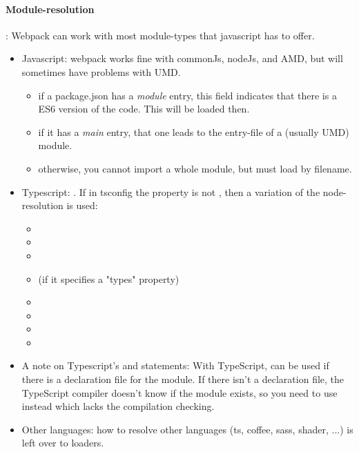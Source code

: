 \paragraph{Module-resolution}: Webpack can work with most module-types that javascript has to offer.

\begin{itemize}
    \item Javascript: webpack works fine with commonJs, nodeJs, and AMD, but will sometimes have problems with UMD.
        \begin{itemize}
            \item if a package.json has a \emph{module} entry, this field indicates that there is a ES6 version of the code. This will be loaded then.
            \item if it has a \emph{main} entry, that one leads to the entry-file of a (usually UMD) module.
            \item otherwise, you cannot import a whole module, but must load by filename.
        \end{itemize}
    \item Typescript: . If in tsconfig the property  is not , then a variation of the node-resolution is used:
        \begin{itemize}
            \item {}
            \item {}
            \item {}
            \item {}  (if it specifies a "types" property)
            \item {}
            \item {}
            \item {}
            \item {}
        \end{itemize}
    \item A note on Typescript's  and  statements: With TypeScript,  can be used if there is a declaration file for the module. If there isn't a declaration file, the TypeScript compiler doesn't know if the module exists, so you need to use  instead which lacks the compilation checking.
    \item Other languages: how to resolve other languages (ts, coffee, sass, shader, ...) is left over to loaders.
\end{itemize}

